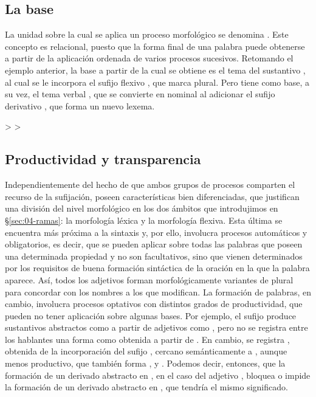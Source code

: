 \subsection{La base}\label{sec:04-base}

La unidad sobre la cual se aplica un proceso morfológico se denomina
. Este concepto es relacional, puesto que la forma final de una
palabra puede obtenerse a partir de la aplicación ordenada de varios procesos
sucesivos. Retomando el ejemplo anterior, la base a partir de la cual se obtiene
 es el tema del sustantivo , al cual se le
incorpora el sufijo flexivo , que marca plural. Pero
 tiene como base, a su vez, el tema verbal , que
se convierte en nominal al adicionar el sufijo derivativo , que
forma un nuevo lexema.

\begin{exe}
  \ex\label{ex:04-mirador}  >  > 
\end{exe}

\subsection{Productividad y transparencia}

Independientemente del hecho de que ambos grupos de procesos comparten el
recurso de la sufijación, poseen características bien diferenciadas, que
justifican una división del nivel morfológico en los dos ámbitos que
introdujimos en §\ref{sec:04-ramas}: la morfología léxica y la morfología
flexiva. Esta última se encuentra más próxima a la sintaxis y, por ello,
involucra procesos automáticos y obligatorios, es decir, que se pueden aplicar
sobre todas las palabras que poseen una determinada propiedad y no son
facultativos, sino que vienen determinados por los requisitos de buena formación
sintáctica de la oración en la que la palabra aparece. Así, todos los adjetivos
forman morfológicamente variantes de plural para concordar con los nombres a
los que modifican. La formación de palabras, en cambio, involucra procesos
optativos con distintos grados de productividad, que pueden no tener aplicación
sobre algunas bases. Por ejemplo, el sufijo  produce sustantivos
abstractos como  a partir de adjetivos
como , pero no se registra entre los hablantes una
forma como  obtenida a partir de .
En cambio, se registra , obtenida de la incorporación del sufijo
, cercano semánticamente a , aunque menos productivo,
que también forma ,  y . Podemos
decir, entonces, que la formación de un derivado abstracto en , en
el caso del adjetivo , bloquea o impide la formación de un
derivado abstracto en , que tendría el mismo significado.

